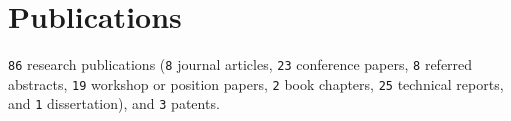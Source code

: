 \documentclass[11pt, letterpaper]{article}
\begin{document}
\section*{Publications}
\texttt{86} research publications
(\texttt{8} journal articles,
\texttt{23} conference papers, \texttt{8} referred abstracts,
\texttt{19} workshop or position papers, \texttt{2} book
chapters, \texttt{25} technical reports, and \texttt{1} dissertation),
and \texttt{3} patents.
\end{document}
